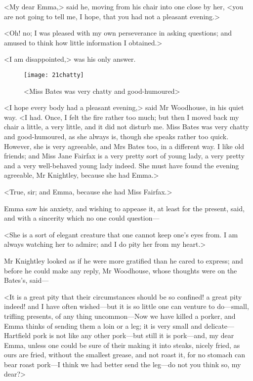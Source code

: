 <My dear Emma,> said he, moving from his chair into one close by her, <you are not going to tell me, I hope, that you had not a pleasant evening.>

<Oh! no; I was pleased with my own perseverance in asking questions; and amused to think how little information I obtained.>

<I am disappointed,> was his only answer.

\begin{figure}[tbph]
\centering
\texttt{[image: 21chatty]}
\caption{<Miss Bates was very chatty and good-humoured>}
\end{figure}

<I hope every body had a pleasant evening,> said Mr Woodhouse, in his quiet way. <I had. Once, I felt the fire rather too much; but then I moved back my chair a little, a very little, and it did not disturb me. Miss Bates was very chatty and good-humoured, as she always is, though she speaks rather too quick. However, she is very agreeable, and Mrs Bates too, in a different way. I like old friends; and Miss Jane Fairfax is a very pretty sort of young lady, a very pretty and a very well-behaved young lady indeed. She must have found the evening agreeable, Mr Knightley, because she had Emma.>

<True, sir; and Emma, because she had Miss Fairfax.>

Emma saw his anxiety, and wishing to appease it, at least for the present, said, and with a sincerity which no one could question—

<She is a sort of elegant creature that one cannot keep one's eyes from. I am always watching her to admire; and I do pity her from my heart.>

Mr Knightley looked as if he were more gratified than he cared to express; and before he could make any reply, Mr Woodhouse, whose thoughts were on the Bates's, said—

<It is a great pity that their circumstances should be so confined! a great pity indeed! and I have often wished—but it is so little one can venture to do—small, trifling presents, of any thing uncommon—Now we have killed a porker, and Emma thinks of sending them a loin or a leg; it is very small and delicate—Hartfield pork is not like any other pork—but still it is pork—and, my dear Emma, unless one could be sure of their making it into steaks, nicely fried, as ours are fried, without the smallest grease, and not roast it, for no stomach can bear roast pork—I think we had better send the leg—do not you think so, my dear?>

